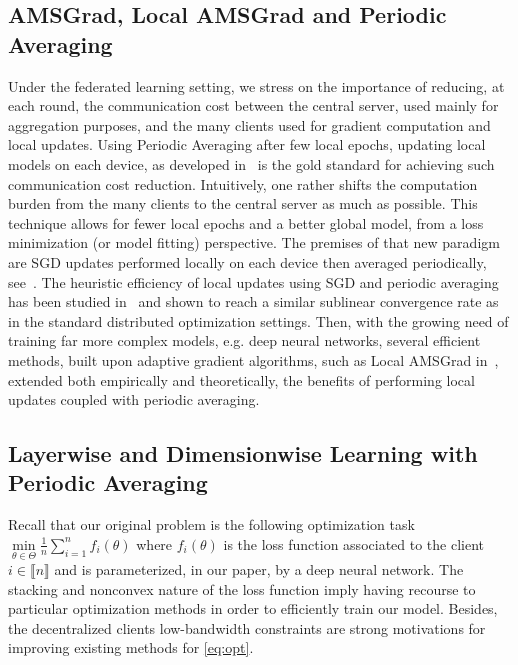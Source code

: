 \documentclass[11pt]{article}
\newcommand{\inter}{\llbracket n \rrbracket}
\begin{document}
\subsection{AMSGrad, Local AMSGrad and Periodic Averaging}
Under the federated learning setting, we stress on the importance of reducing, at each round, the communication cost between the central server, used mainly for aggregation purposes, and the many clients used for gradient computation and local updates.
Using Periodic Averaging after few local epochs, updating local models on each device, as developed in~\cite{mcmahan2017communication} is the gold standard for achieving such communication cost reduction.
Intuitively, one rather shifts the computation burden from the many clients to the central server as much as possible. 
This technique allows for fewer local epochs and a better global model, from a loss minimization (or model fitting) perspective.
The premises of that new paradigm are SGD updates performed locally on each device then averaged periodically, see~\cite{konevcny2016federated, zhou2017convergence}.
The heuristic efficiency of local updates using SGD and periodic averaging has been studied in~\cite{stich2018local,yu2019linear} and shown to reach a similar sublinear convergence rate as in the standard distributed optimization settings.
Then, with the growing need of training far more complex models, e.g. deep neural networks, several efficient methods, built upon adaptive gradient algorithms, such as Local AMSGrad in~\cite{chen2020toward}, extended both empirically and theoretically, the benefits of performing local updates coupled with periodic averaging.



\subsection{Layerwise and Dimensionwise Learning with Periodic Averaging}

Recall that our original problem is the following optimization task $\min \limits_{\theta \in \Theta} \frac{1}{n} \sum_{i=1}^n f_i(\theta)$ where $f_i(\theta)$ is the loss function associated to the client $i \in \inter$ and is parameterized, in our paper, by a deep neural network.
The stacking and nonconvex nature of the loss function imply having recourse to particular optimization methods in order to efficiently train our model.
Besides, the decentralized clients low-bandwidth constraints are strong motivations for improving existing methods for \eqref{eq:opt}.  
\end{document}
